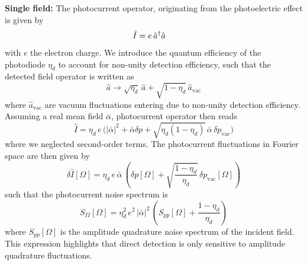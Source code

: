 \noindent \textbf{Single field: } The photocurrent operator, originating from the photoelectric effect is given by
\begin{equation}
  \begin{split}
    \hat I &= e \, \hat a^{\dagger}\hat a^{\vphantom{\dagger}}
  \end{split}
\end{equation}
with $e$ the electron charge. We introduce the quantum efficiency of the photodiode $\eta_d$ to account for non-unity detection efficiency, such that the detected field operator is written as 
\[\hat a \rightarrow \sqrt{\eta_d} \, \hat a + \sqrt{1-\eta_d} \, \hat a_{\mathrm{vac}}\]
where $\hat a_{\mathrm{vac}}$ are vacuum fluctuations entering due to non-unity detection efficiency. Assuming a real mean field $\bar \alpha$, photocurrent operator then reads
\begin{equation}
    \hat I = \eta_d \, e \, \bigg(|\bar \alpha|^2 + \bar \alpha \delta p + \sqrt{\eta_d(1-\eta_d)} \, \bar \alpha \, \delta p_{\mathrm{vac}}\bigg)
\end{equation}
where we neglected second-order terms. The photocurrent fluctuations in Fourier space are then given by
\begin{equation}
    \delta \hat I[\Omega] = \eta_d \, e \, \bar \alpha \, \left( \delta p[\Omega] +  \sqrt{\dfrac{1-\eta_d}{\eta_d}} \,  \delta p_{\mathrm{vac}}[\Omega] \right)
\end{equation}
such that the photocurrent noise spectrum is 
\begin{equation}
    S_{II}[\Omega] =  \eta_d^2 \, e^2 \, |\bar \alpha|^2 \, \left( S_{pp}[\Omega] + \dfrac{1-\eta_d}{\eta_d} \right) 
\end{equation}
where $S_{pp}[\Omega]$ is the amplitude quadrature noise spectrum of the incident field. This expression highlights that direct detection is only sensitive to amplitude quadrature fluctuations. \\

